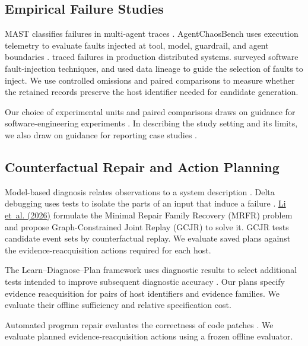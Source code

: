 \documentclass[sn-basic]{sn-jnl}%
\theoremstyle{thmstyleone}%
\theoremstyle{thmstyletwo}%
\theoremstyle{thmstylethree}%
\begin{document}
\subsection{Empirical Failure Studies}\label{sec:empirical-failure-studies}

MAST classifies failures in multi-agent traces \citep{mast2025}. AgentChaosBench uses execution telemetry to evaluate faults injected at tool, model, guardrail, and agent boundaries \citep{zhang2026agentchaosbench}. \citet{yuan2014} traced failures in production distributed systems. \citet{natella2016} surveyed software fault-injection techniques, and \citet{alvaro2015} used data lineage to guide the selection of faults to inject. We use controlled omissions and paired comparisons to measure whether the retained records preserve the host identifier needed for candidate generation.

Our choice of experimental units and paired comparisons draws on guidance for software-engineering experiments \citep{kitchenham2002,wohlin2012}. In describing the study setting and its limits, we also draw on guidance for reporting case studies \citep{runeson2009casestudy}.

\subsection{Counterfactual Repair and Action Planning}\label{sec:counterfactual-repair}

Model-based diagnosis relates observations to a system description \citep{reiter1987}. Delta debugging uses tests to isolate the parts of an input that induce a failure \citep{zeller2002}. \href{https://arxiv.org/abs/2608.29228v2}{Li et~al. (2026)} formulate the Minimal Repair Family Recovery (MRFR) problem and propose Graph-Constrained Joint Replay (GCJR) to solve it. GCJR tests candidate event sets by counterfactual replay. We evaluate saved plans against the evidence-reacquisition actions required for each host.

The Learn--Diagnose--Plan framework uses diagnostic results to select additional tests intended to improve subsequent diagnostic accuracy \citep{elmishali2018ldp}. Our plans specify evidence reacquisition for pairs of host identifiers and evidence families. We evaluate their offline sufficiency and relative specification cost.

Automated program repair evaluates the correctness of code patches \citep{aprcacm2019}. We evaluate planned evidence-reacquisition actions using a frozen offline evaluator.
\end{document}
